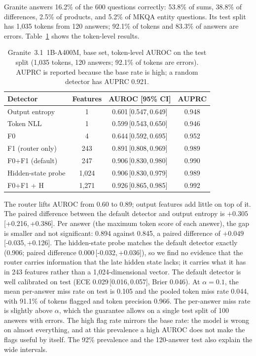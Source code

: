 \documentclass[11pt]{article}
\newcommand{\FZ}{\textsf{F0}}
\newcommand{\FO}{\textsf{F1}}
\newcommand{\FZO}{\textsf{F0+F1}}
\newcommand{\Hs}{\textsf{H}}
\newcommand{\ci}[2]{\,[#1,\,#2]}
\begin{document}
Granite answers 16.2\% of the 600 questions correctly: 53.8\% of sums, 38.8\% of differences, 2.5\% of products, and 5.2\% of MKQA entity questions.
Its test split has 1,035 tokens from 120 answers; 92.1\% of tokens and 83.3\% of answers are errors.
Table~\ref{tab:granite} shows the token-level results.

\begin{table}[t]
\centering
\small
\caption{Granite~3.1~1B-A400M, base set, token-level AUROC on the test split (1,035 tokens, 120 answers; 92.1\% of tokens are errors). AUPRC is reported because the base rate is high; a random detector has AUPRC 0.921.}
\label{tab:granite}
\begin{tabular}{lccc}
\toprule
Detector & Features & AUROC [95\% CI] & AUPRC \\
\midrule
Output entropy & 1 & 0.601\ci{0.547}{0.649} & 0.948 \\
Token NLL & 1 & 0.599\ci{0.543}{0.650} & 0.946 \\
\FZ{} & 4 & 0.644\ci{0.592}{0.695} & 0.952 \\
\FO{} (router only) & 243 & 0.891\ci{0.808}{0.969} & 0.989 \\
\FZO{} (default) & 247 & 0.906\ci{0.830}{0.980} & 0.990 \\
Hidden-state probe & 1,024 & 0.906\ci{0.830}{0.979} & 0.989 \\
\FZO{} + \Hs{} & 1,271 & 0.926\ci{0.865}{0.985} & 0.992 \\
\bottomrule
\end{tabular}
\end{table}

The router lifts AUROC from 0.60 to 0.89; output features add little on top of it.
The paired difference between the default detector and output entropy is $+0.305$\ci{+0.216}{+0.386}.
Per answer (the maximum token score of each answer), the gap is smaller and not significant: 0.894 against 0.845, a paired difference of $+0.049$\ci{-0.035}{+0.126}.
The hidden-state probe matches the default detector exactly (0.906; paired difference $0.000$\ci{-0.032}{+0.036}), so we find no evidence that the router carries information that the late hidden state lacks; it carries what it has in 243 features rather than a 1,024-dimensional vector.
The default detector is well calibrated on test (ECE 0.029\ci{0.016}{0.057}, Brier 0.046).
At $\alpha=0.1$, the mean per-answer miss rate on test is 0.105 and the pooled token miss rate 0.044, with 91.1\% of tokens flagged and token precision 0.966.
The per-answer miss rate is slightly above $\alpha$, which the guarantee allows on a single test split of 100 answers with errors.
The high flag rate mirrors the base rate: the model is wrong on almost everything, and at this prevalence a high AUROC does not make the flags useful by itself.
The 92\% prevalence and the 120-answer test also explain the wide intervals.
\end{document}
